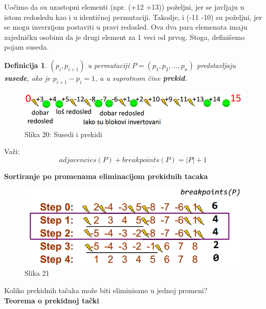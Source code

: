 \documentclass{article}
\newtheorem{definicija}{Definicija}
\begin{document}
\hspace{0.7cm}Uočimo da su uzastopni elementi (npr. (+12 +13)) poželjni, jer se javljaju u istom redosledu kao i u identičnoj permutaciji. Takodje, i (-11 -10) su poželjni, jer se mogu inverzijom postaviti u pravi redosled. Ova dva para elemenata imaju zajedničku osobinu da je drugi element za 1 veci od prvog. Stoga, definišemo pojam suseda.

\begin{definicija}{$(p_i, p_{i+1})$ u permutaciji $P = (p_1, p_2, ..., p_n)$ predstavljaju \textbf{susede}, ako je $p_{i+1} - p_i = 1$, a u suprotnom čine \textbf{prekid}.}
\end{definicija}

\begin{figure}[h!]
\centering
\includegraphics[scale=0.75]{slike/dobar_los.PNG}
\caption{Slika 20: Susedi i prekidi}
\label{slika:X}
\end{figure}

Važi:\\
$$ adjacencies(P) + breakpoints(P) = |P| + 1$$

\hspace{1cm}

\large{\textbf{Sortiranje po promenama eliminacijom prekidnih tacaka}}\\

\begin{figure}[h]
\centering
\includegraphics[scale=0.7]{slike/koliko.PNG}
\caption{Slika 21}
\label{slika:X}
\end{figure}

\noindent Koliko prekidnih tačaka može biti eliminisano u jednoj promeni?\\

\vspace{1cm}
\hspace{2cm} \textbf{Teorema o prekidnoj tački}\\
\end{document}
